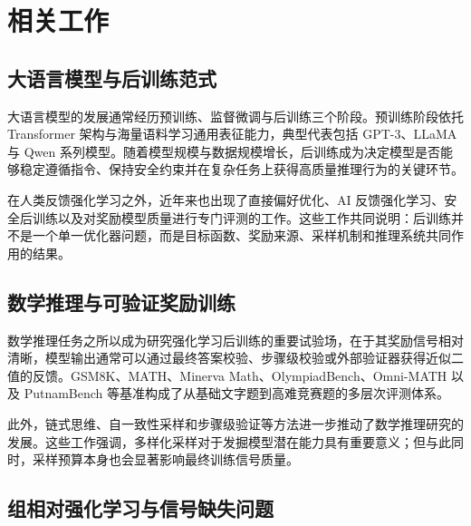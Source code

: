 \chapter{相关工作}\label{chap:related}

\section{大语言模型与后训练范式}

大语言模型的发展通常经历预训练、监督微调与后训练三个阶段。预训练阶段依托 Transformer 架构与海量语料学习通用表征能力，典型代表包括 GPT-3、LLaMA 与 Qwen 系列模型\citep{vaswani2017attention,brown2020languagemodels,touvron2023llama,bai2023qwen,zhao2023surveylargelanguagemodels}。随着模型规模与数据规模增长，后训练成为决定模型是否能够稳定遵循指令、保持安全约束并在复杂任务上获得高质量推理行为的关键环节\citep{ouyang2022training,dai2023safe,lee2023rlaif,chaudhari2024rlhf,rafailov2023direct,ahmadian2024back}。

在人类反馈强化学习之外，近年来也出现了直接偏好优化、AI 反馈强化学习、安全后训练以及对奖励模型质量进行专门评测的工作\citep{rafailov2023direct,dai2023safe,lee2023rlaif,lambert2024rewardbench}。这些工作共同说明：后训练并不是一个单一优化器问题，而是目标函数、奖励来源、采样机制和推理系统共同作用的结果。

\section{数学推理与可验证奖励训练}

数学推理任务之所以成为研究强化学习后训练的重要试验场，在于其奖励信号相对清晰，模型输出通常可以通过最终答案校验、步骤级校验或外部验证器获得近似二值的反馈\citep{cobbe2021training,lightman2023verify,lewkowycz2022solving,ying2024internlmmath,shao2024deepseekmath}。GSM8K、MATH、Minerva Math、OlympiadBench、Omni-MATH 以及 PutnamBench 等基准构成了从基础文字题到高难竞赛题的多层次评测体系\citep{cobbe2021training,hendrycks2021math,lewkowycz2022solving,he2024olympiadbench,gao2024omnimath,tsoukalas2024putnambench}。

此外，链式思维、自一致性采样和步骤级验证等方法进一步推动了数学推理研究的发展\citep{wei2022chain,wang2022selfconsistency,lightman2023verify}。这些工作强调，多样化采样对于发掘模型潜在能力具有重要意义；但与此同时，采样预算本身也会显著影响最终训练信号质量。

\section{组相对强化学习与信号缺失问题}

